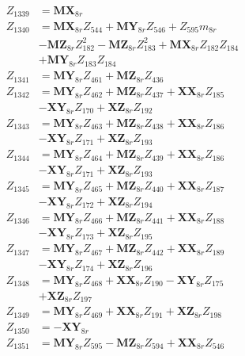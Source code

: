 \begin{multicols}{2}
\begin{align}
Z_{1339} &= \mathbf{MX}_{8r} \nonumber \\
Z_{1340} &= \mathbf{MX}_{8r}Z_{544} + \mathbf{MY}_{8r}Z_{546} + Z_{595}m_{8r}  \nonumber \\
&- \mathbf{MZ}_{8r}Z_{182}^2 - \mathbf{MZ}_{8r}Z_{183}^2 + \mathbf{MX}_{8r}Z_{182}Z_{184}  \nonumber \\
&+ \mathbf{MY}_{8r}Z_{183}Z_{184} \nonumber \\
Z_{1341} &= \mathbf{MY}_{8r}Z_{461} + \mathbf{MZ}_{8r}Z_{436} \nonumber \\
Z_{1342} &= \mathbf{MY}_{8r}Z_{462} + \mathbf{MZ}_{8r}Z_{437} + \mathbf{XX}_{8r}Z_{185}  \nonumber \\
&- \mathbf{XY}_{8r}Z_{170} + \mathbf{XZ}_{8r}Z_{192} \nonumber \\
Z_{1343} &= \mathbf{MY}_{8r}Z_{463} + \mathbf{MZ}_{8r}Z_{438} + \mathbf{XX}_{8r}Z_{186}  \nonumber \\
&- \mathbf{XY}_{8r}Z_{171} + \mathbf{XZ}_{8r}Z_{193} \nonumber \\
Z_{1344} &= \mathbf{MY}_{8r}Z_{464} + \mathbf{MZ}_{8r}Z_{439} + \mathbf{XX}_{8r}Z_{186}  \nonumber \\
&- \mathbf{XY}_{8r}Z_{171} + \mathbf{XZ}_{8r}Z_{193} \nonumber \\
Z_{1345} &= \mathbf{MY}_{8r}Z_{465} + \mathbf{MZ}_{8r}Z_{440} + \mathbf{XX}_{8r}Z_{187}  \nonumber \\
&- \mathbf{XY}_{8r}Z_{172} + \mathbf{XZ}_{8r}Z_{194} \nonumber \\
Z_{1346} &= \mathbf{MY}_{8r}Z_{466} + \mathbf{MZ}_{8r}Z_{441} + \mathbf{XX}_{8r}Z_{188}  \nonumber \\
&- \mathbf{XY}_{8r}Z_{173} + \mathbf{XZ}_{8r}Z_{195} \nonumber \\
Z_{1347} &= \mathbf{MY}_{8r}Z_{467} + \mathbf{MZ}_{8r}Z_{442} + \mathbf{XX}_{8r}Z_{189}  \nonumber \\
&- \mathbf{XY}_{8r}Z_{174} + \mathbf{XZ}_{8r}Z_{196} \nonumber \\
Z_{1348} &= \mathbf{MY}_{8r}Z_{468} + \mathbf{XX}_{8r}Z_{190} - \mathbf{XY}_{8r}Z_{175}  \nonumber \\
&+ \mathbf{XZ}_{8r}Z_{197} \nonumber \\
Z_{1349} &= \mathbf{MY}_{8r}Z_{469} + \mathbf{XX}_{8r}Z_{191} + \mathbf{XZ}_{8r}Z_{198} \nonumber \\
Z_{1350} &= -\mathbf{XY}_{8r} \nonumber \\
Z_{1351} &= \mathbf{MY}_{8r}Z_{595} - \mathbf{MZ}_{8r}Z_{594} + \mathbf{XX}_{8r}Z_{546}  \nonumber \\

\end{align}
\end{multicols}
